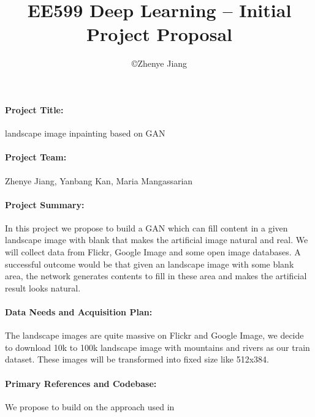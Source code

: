 \documentclass[11pt]{article}
\title{\bf EE599 Deep Learning -- Initial Project Proposal}
\author{\copyright  Zhenye Jiang}
\begin{document}
\maketitle

\paragraph{Project Title:}  landscape image inpainting based on GAN

\paragraph{Project Team:} Zhenye Jiang, Yanbang Kan, Maria Mangassarian

\paragraph{Project Summary:}   In this project we propose to build a GAN which can fill content in a given landscape image with blank that makes the artificial image natural and real. We will collect data from Flickr, Google Image and some open image databases. A successful outcome would be that given an landscape image with some blank area, the network generates contents to fill in these area and makes the artificial result looks natural. 

\paragraph{Data Needs and Acquisition Plan:}  The landscape images are quite massive on Flickr and Google Image, we decide to download 10k to 100k landscape image with mountains and rivers as our train dataset. These images will be transformed into fixed size like 512x384.


\paragraph{Primary References and Codebase:}  We propose to build on the approach used in 
\end{document}
